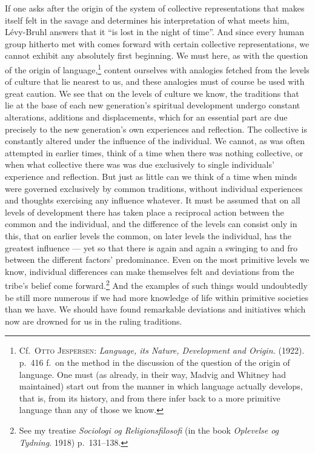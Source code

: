 \documentclass[12pt]{book}
\newcommand{\opage}[1]{\marginnote{\footnotesize\textit{[#1]}}}
\begin{document}
If one asks after the origin of the system of collective representations that
makes itself felt in the savage and determines his interpretation of what meets
him, Lévy-Bruhl answers that it ``is lost in the night of time''. And since
every human group hitherto met with comes forward with certain collective
representations, we cannot exhibit any absolutely first beginning. We must
here, as with the question of the origin of language,\footnote{Cf.\
\textsc{Otto Jespersen:} \textit{Language, its Nature, Development and Origin.}
(1922). p.\ 416 f.\ on the method in the discussion of the question of the
origin of language. One must (as already, in their way, Madvig and Whitney had
maintained) start out from the manner in which language actually develops, that
is, from its history, and from there infer back to a more primitive language
than any of those we know.} content ourselves with analogies fetched from the
levels of culture that lie nearest to us, and these analogies must of course be
used with great \opage{14}caution. We see that on the levels of culture we know, the
traditions that lie at the base of each new generation's spiritual development
undergo constant alterations, additions and displacements, which for an
essential part are due precisely to the new generation's own experiences and
reflection. The collective is constantly altered under the influence of the
individual. We cannot, as was often attempted in earlier times, think of a time
when there was nothing collective, or when what collective there was was due
exclusively to single individuals' experience and reflection. But just as
little can we think of a time when minds were governed exclusively by common
traditions, without individual experiences and thoughts exercising any
influence whatever. It must be assumed that on all levels of development there
has taken place a reciprocal action between the common and the individual, and
the difference of the levels can consist only in this, that on earlier levels
the common, on later levels the individual, has the greatest influence --- yet
so that there is again and again a swinging to and fro between the different
factors' predominance. Even on the most primitive levels we know, individual
differences can make themselves felt and deviations from the tribe's belief
come forward.\footnote{See my treatise \textit{Sociologi og Religionsfilosofi}
(in the book \textit{Oplevelse og Tydning}. 1918) p.\ 131--138.} And the
examples of such things would undoubtedly be still more numerous if we had more
knowledge of life within primitive societies than we have. We should have found
remarkable deviations and initiatives which now are drowned for us in the
ruling traditions.
\end{document}
